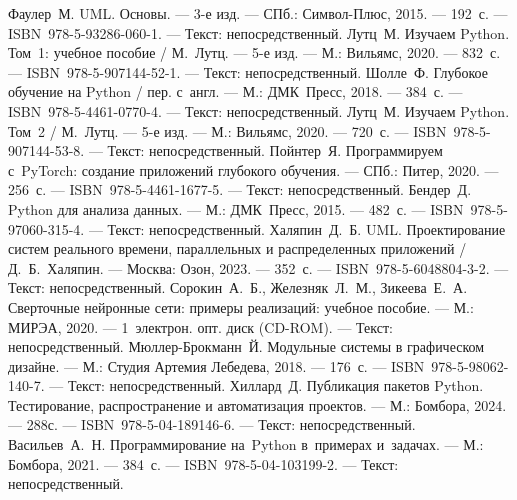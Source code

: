 \begin{thebibliography}{99}
	 Фаулер~М. UML. Основы. --- 3-е изд. --- СПб.: Символ-Плюс, 2015. --- 192~с. --- ISBN~978-5-93286-060-1. --- Текст: непосредственный.
	 Лутц~М. Изучаем Python. Том~1: учебное пособие / М.~Лутц. --- 5-е изд. --- М.: Вильямс, 2020. --- 832~с. --- ISBN~978-5-907144-52-1. --- Текст: непосредственный.
	 Шолле~Ф. Глубокое обучение на Python / пер. с~англ. --- М.: ДМК~Пресс, 2018. --- 384~с. --- ISBN~978-5-4461-0770-4. --- Текст: непосредственный.
	 Лутц~М. Изучаем Python. Том~2 / М.~Лутц. --- 5-е изд. --- М.: Вильямс, 2020. --- 720~с. --- ISBN~978-5-907144-53-8. --- Текст: непосредственный.
	 Пойнтер~Я. Программируем с~PyTorch: создание приложений глубокого обучения. --- СПб.: Питер, 2020. --- 256~с. --- ISBN~978-5-4461-1677-5. --- Текст: непосредственный.
	 Бендер~Д. Python для анализа данных. --- М.: ДМК~Пресс, 2015. --- 482~с. --- ISBN~978-5-97060-315-4. --- Текст: непосредственный.
	 Халяпин~Д.~Б. UML. Проектирование систем реального времени, параллельных и распределенных приложений / Д.~Б.~Халяпин. --- Москва: Озон, 2023. --- 352~с. --- ISBN~978-5-6048804-3-2. --- Текст: непосредственный.
	 Сорокин~А.~Б., Железняк~Л.~М., Зикеева~Е.~А. Сверточные нейронные сети: примеры реализаций: учебное пособие. --- М.: МИРЭА, 2020. --- 1~электрон. опт. диск (CD-ROM). --- Текст: непосредственный.
	 Мюллер-Брокманн~Й. Модульные системы в графическом дизайне. --- М.: Студия Артемия Лебедева, 2018. --- 176~с. --- ISBN~978-5-98062-140-7. --- Текст: непосредственный.
	 Хиллард~Д. Публикация пакетов Python. Тестирование, распространение и автоматизация проектов. — М.: Бомбора, 2024. — 288с. — ISBN~978-5-04-189146-6. — Текст: непосредственный.
	 Васильев~А.~Н. Программирование на~Python в~примерах и~задачах. — М.: Бомбора, 2021. — 384~с. — ISBN~978-5-04-103199-2. — Текст: непосредственный.
\end{thebibliography}
